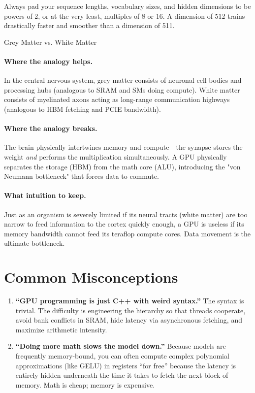 Always pad your sequence lengths, vocabulary sizes, and hidden dimensions to be powers of 2, or at the very least, multiples of 8 or 16. A dimension of 512 trains drastically faster and smoother than a dimension of 511.

\begin{analogybox}{Grey Matter vs. White Matter}
  \paragraph{Where the analogy helps.}
  In the central nervous system, grey matter consists of neuronal cell bodies and processing hubs (analogous to SRAM and SMs doing compute). White matter consists of myelinated axons acting as long-range communication highways (analogous to HBM fetching and PCIE bandwidth). 

  \paragraph{Where the analogy breaks.}
  The brain physically intertwines memory and compute—the synapse stores the weight \emph{and} performs the multiplication simultaneously. A GPU physically separates the storage (HBM) from the math core (ALU), introducing the "von Neumann bottleneck" that forces data to commute.

  \paragraph{What intuition to keep.}
  Just as an organism is severely limited if its neural tracts (white matter) are too narrow to feed information to the cortex quickly enough, a GPU is useless if its memory bandwidth cannot feed its teraflop compute cores. Data movement is the ultimate bottleneck.
\end{analogybox}


\section{Common Misconceptions}
\label{ch:04:sec:misconceptions}

\begin{enumerate}
  \item \textbf{``GPU programming is just C++ with weird syntax.''} The syntax is trivial. The difficulty is engineering the hierarchy so that threads cooperate, avoid bank conflicts in SRAM, hide latency via asynchronous fetching, and maximize arithmetic intensity.
  \item \textbf{``Doing more math slows the model down.''} Because models are frequently memory-bound, you can often compute complex polynomial approximations (like GELU) in registers ``for free'' because the latency is entirely hidden underneath the time it takes to fetch the next block of memory. Math is cheap; memory is expensive.
\end{enumerate}



